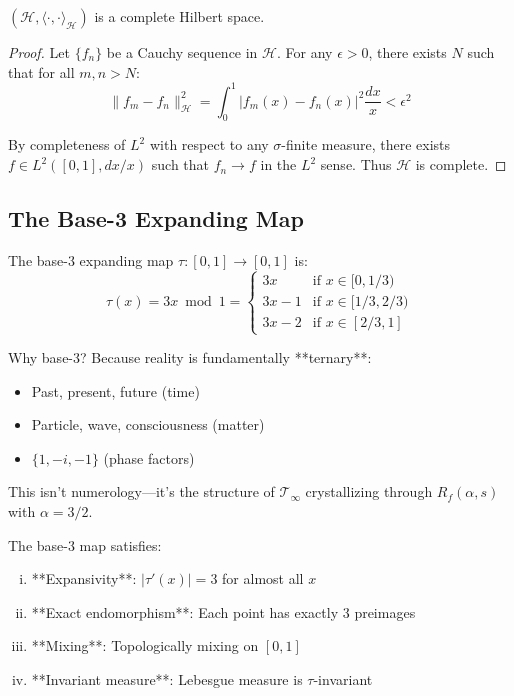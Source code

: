 \begin{proposition}[Completeness]\label{prop:hilbert-completeness}
$(\mathcal{H}, \langle \cdot, \cdot \rangle_{\mathcal{H}})$ is a complete Hilbert space.
\end{proposition}

\begin{proof}
Let $\{f_n\}$ be a Cauchy sequence in $\mathcal{H}$. For any $\epsilon > 0$, there exists $N$ such that for all $m, n > N$:
\begin{equation}
\|f_m - f_n\|_{\mathcal{H}}^2 = \int_0^1 |f_m(x) - f_n(x)|^2 \frac{dx}{x} < \epsilon^2
\end{equation}

By completeness of $L^2$ with respect to any $\sigma$-finite measure, there exists $f \in L^2([0,1], dx/x)$ such that $f_n \to f$ in the $L^2$ sense. Thus $\mathcal{H}$ is complete.
\end{proof}

\subsection{The Base-3 Expanding Map}

\begin{defn}\label{def:base3-map}
The base-3 expanding map $\tau: [0,1] \to [0,1]$ is:
\begin{equation}
\tau(x) = 3x \bmod 1 = \begin{cases}
3x & \text{if } x \in [0, 1/3) \\
3x - 1 & \text{if } x \in [1/3, 2/3) \\
3x - 2 & \text{if } x \in [2/3, 1]
\end{cases}
\end{equation}
\end{defn}

\begin{keyidea}
Why base-3? Because reality is fundamentally **ternary**:
\begin{itemize}
\item Past, present, future (time)
\item Particle, wave, consciousness (matter)
\item $\{1, -i, -1\}$ (phase factors)
\end{itemize}
This isn't numerology—it's the structure of $\mathcal{T}_\infty$ crystallizing through $R_f(\alpha, s)$ with $\alpha = 3/2$.
\end{keyidea}

\begin{proposition}\label{prop:base3-properties}
The base-3 map satisfies:
\begin{enumerate}[(i)]
\item **Expansivity**: $|\tau'(x)| = 3$ for almost all $x$
\item **Exact endomorphism**: Each point has exactly 3 preimages
\item **Mixing**: Topologically mixing on $[0,1]$
\item **Invariant measure**: Lebesgue measure is $\tau$-invariant
\end{enumerate}
\end{proposition}

